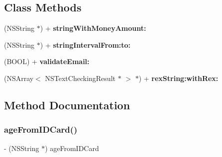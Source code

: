 \subsection*{Class Methods}
\begin{DoxyCompactItemize}
\item 
\mbox{\label{category_n_s_string_07_b_x_extension_08_aa0db1fc2032721f8bfbc10c23c14dd3d}} 
(N\+S\+String $\ast$) + {\bfseries string\+With\+Money\+Amount\+:}
\item 
\mbox{\label{category_n_s_string_07_b_x_extension_08_a5a48bb9f402c2bfdb2bd37cc8aa3f65b}} 
(N\+S\+String $\ast$) + {\bfseries string\+Interval\+From\+:to\+:}
\item 
\mbox{\label{category_n_s_string_07_b_x_extension_08_a76dfcbe6d3cb9e158d15b699e90680cf}} 
(B\+O\+OL) + {\bfseries validate\+Email\+:}
\item 
\mbox{\label{category_n_s_string_07_b_x_extension_08_af5a281096d45cee5405a8113018b53c2}} 
(N\+S\+Array$<$ N\+S\+Text\+Checking\+Result $\ast$ $>$ $\ast$) + {\bfseries rex\+String\+:with\+Rex\+:}
\end{DoxyCompactItemize}


\subsection{Method Documentation}
\mbox{\label{category_n_s_string_07_b_x_extension_08_a35064bd6a5b401064197de8aea3e05e7}} 
\subsubsection{\texorpdfstring{age\+From\+I\+D\+Card()}{ageFromIDCard()}}
{\footnotesize\ttfamily -\/ (N\+S\+String $\ast$) age\+From\+I\+D\+Card \begin{DoxyParamCaption}{ }\end{DoxyParamCaption}}

